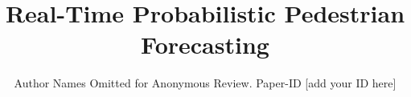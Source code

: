 \documentclass[conference]{IEEEtran}
\begin{document}
\title{Real-Time Probabilistic Pedestrian Forecasting}

\author{Author Names Omitted for Anonymous Review. Paper-ID [add your ID here]}





% 


\maketitle
\end{document}

